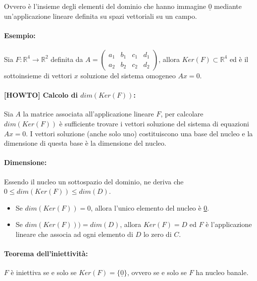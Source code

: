 \documentclass[a4paper]{article}
\begin{document}
        Ovvero \`{e} l'insieme degli elementi del dominio che hanno immagine $\underline{0}$ mediante un'applicazione lineare definita su spazi vettoriali su un campo.

        \paragraph{Esempio:}
        Sia
        $ F\!: \mathbb{R}^{4} \to \mathbb{R}^{2} $
        definita da
        $
                A = \begin{pmatrix}
                        a_1 & b_1 & c_1 & d_1 \\
                        a_2 & b_2 & c_2 & d_2
                \end{pmatrix}
        $,
        allora
        $ Ker(F) \subset \mathbb{R}^{4} $
        ed \`{e} il sottoinsieme di vettori $x$ soluzione del sistema omogeneo $Ax = 0$.

        \paragraph{[HOWTO] Calcolo di $dim(Ker(F))$:}
        Sia $A$ la matrice associata all'applicazione lineare $F$, per calcolare $dim(Ker(F))$ \`{e} sufficiente trovare i vettori soluzione del sistema di equazioni $Ax = 0$.
        I vettori soluzione (anche solo uno) costituiscono una base del nucleo e la dimensione di questa base \`{e} la dimensione del nucleo.

        \paragraph{Dimensione:}
        Essendo il nucleo un sottospazio del dominio, ne deriva che $0 \leq dim(Ker(F)) \leq dim(D)$.
        \begin{itemize}
                \item Se $dim(Ker(F)) = 0$, allora l'unico elemento del nucleo \`{e} \underline{0}.
                \item Se $dim(Ker(F))) = dim(D)$, allora $Ker(F) = D$ ed $F$ \`{e} l'applicazione lineare che associa ad ogni elemento di $D$ lo zero di $C$.
        \end{itemize}

        \paragraph{Teorema dell'iniettivit\`{a}:}
        $F$ \`{e} iniettiva se e solo se $Ker(F) = \{ \underline{0} \}$, ovvero se e solo se $F$ ha nucleo banale.
\end{document}
